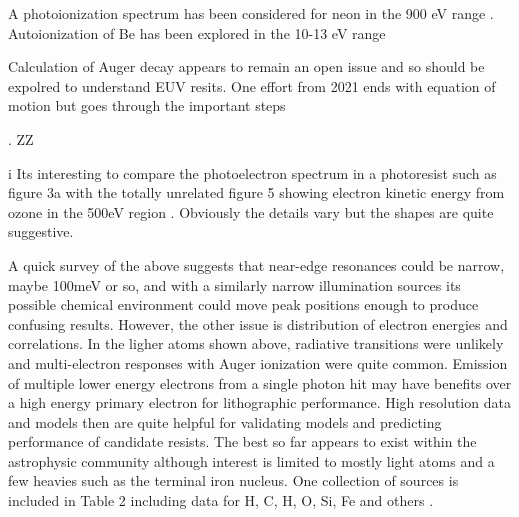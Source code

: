 A photoionization spectrum has been considered for neon in the 900 eV
range
\cite{Muller_Bernhardt_Borovik_Photoionization_Atoms_}
.
Autoionization of Be has been explored in the 10-13 eV range
\cite{Wehlitz_charvv263_Bluett_Resonance_parameters_autoionizing_2003} 


Calculation of Auger decay appears to remain an open issue and so should
be expolred to understand EUV resits. One effort from 2021 ends with
equation of motion but goes through the important steps

\cite{Skomorowski_Krylov_Feshbach_Fano_approach_2021}
.
ZZ

i
Its interesting to compare the photoelectron spectrum in a photoresist
such as figure 3a 
\cite{DouglasGuerreroadditionalGillesRAmblard_Dissociative_photoionization_2023}
with the totally unrelated figure 5 showing electron kinetic energy
from ozone in the 500eV region 
\cite{Taioli_Simonucci_Resonant_Normal_2021}.
Obviously the details vary but the shapes are quite suggestive.


A quick survey of the above suggests that near-edge resonances
could be narrow, maybe 100meV or so, and with a similarly narrow
illumination sources its possible chemical environment could
move peak positions enough to produce confusing results.
However, the other issue is distribution of electron 
energies and correlations. In the ligher atoms shown above,
radiative transitions were unlikely and multi-electron responses
with Auger ionization were quite common. Emission of multiple lower
energy electrons from a single photon hit may have benefits
over a high energy primary electron for lithographic performance.
High resolution data and models then are quite helpful for 
validating models and predicting performance of candidate resists.
The best so far appears to exist within the astrophysic community
although interest is limited to mostly light atoms and
a few heavies such as the terminal iron nucleus.
One collection of sources is included in Table 2
including data for H, C, H, O, Si, Fe and others
\cite{Gatuzz_Garcia_Kallman_ISMabs_COMPREHENSIVE_2015}.


